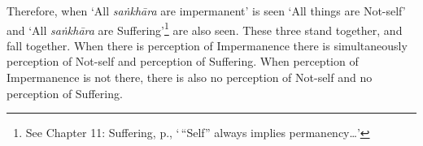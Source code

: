 Therefore, when `All \emph{saṅkhāra} are impermanent' is seen `All things are Not-self' and `All \emph{saṅkhāra} are Suffering'\footnote{See Chapter 11: Suffering, p.\pageref{ch-11-impermanent}, `\,``Self'' always implies permanency\ldots{}'} are also seen. These three stand together, and fall together. When there is perception of Impermanence there is simultaneously perception of Not-self and perception of Suffering. When perception of Impermanence is not there, there is also no perception of Not-self and no perception of Suffering.
